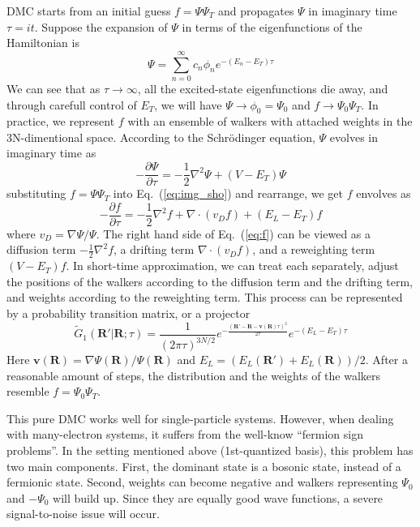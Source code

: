 \documentclass[aps,prl,reprint,groupedaddress]{revtex4-1}
\begin{document}
DMC starts from an initial guess $f = \Psi\Psi_T$ and propagates $\Psi$ in imaginary time $\tau=it$.
Suppose the expansion of $\Psi$ in terms of the eigenfunctions of the Hamiltonian is
\begin{equation}
\Psi = \sum_{n=0}^{\infty}c_n\phi_ne^{-(E_n-E_T)\tau}
\end{equation}
We can see that as $\tau\to\infty$, all the excited-state eigenfunctions die away, and through carefull control of $E_T$, we will have $\Psi\to\phi_0=\Psi_0$ and $f\to\Psi_0\Psi_T$.
In practice, we represent $f$ with an ensemble of walkers with attached weights in the 3N-dimentional space.
According to the Schrödinger equation, $\Psi$ evolves in imaginary time as
\begin{equation}
\label{eq:img_sho}
-\frac{\partial \Psi}{\partial \tau} = -\frac{1}{2}\nabla^2\Psi+(V-E_T)\Psi
\end{equation}
%
substituting $f=\Psi\Psi_T$ into Eq.~(\ref{eq:img_sho}) and rearrange, we get $f$ envolves as
\begin{equation}
\label{eq:f}
-\frac{\partial f}{\partial \tau} = -\frac{1}{2}\nabla^2f+\nabla\cdot(v_Df)+(E_L-E_T)f
\end{equation}
where $v_D = \nabla\Psi/\Psi$.
The right hand side of Eq.~(\ref{eq:f}) can be viewed as a diffusion term $-\frac{1}{2}\nabla^2f$, a drifting term $\nabla\cdot(v_Df)$, and a reweighting term $(V-E_T)f$.
In short-time approximation, we can treat each separately, adjust the positions of the walkers according to the diffusion term and the drifting term, and weights according to the reweighting term.
This process can be represented by a probability transition matrix, or a projector
\begin{equation}
\label{eq:G1t}
\widetilde{G}_1(\bm{R'}|\bm{R};\tau)
= \frac{1}{(2\pi\tau)^{3N/2}} e^{-\frac{(\bm{R'}-\bm{R}-\bm{v}(\bm{R})\tau)^2}{2\tau}} e^{-\left(E_L-E_T\right)\tau}
\end{equation}
Here $\bm{v}(\bm{R}) = \nabla\Psi(\bm{R})/\Psi(\bm{R})$ and $E_L = (E_L(\bm{R'})+E_L(\bm{R}))/2$.
After a reasonable amount of steps, the distribution and the weights of the walkers resemble $f=\Psi_0\Psi_T$.

This pure DMC works well for single-particle systems.
However, when dealing with many-electron systems, it suffers from the well-know ``fermion sign problems''.
In the setting mentioned above (1st-quantized basis), this problem has two main components.
First, the dominant state is a bosonic state, instead of a fermionic state.
Second, weights can become negative and walkers representing $\Psi_0$ and $-\Psi_0$ will build up. Since they are equally good wave functions, a severe signal-to-noise issue will occur.
\end{document}
